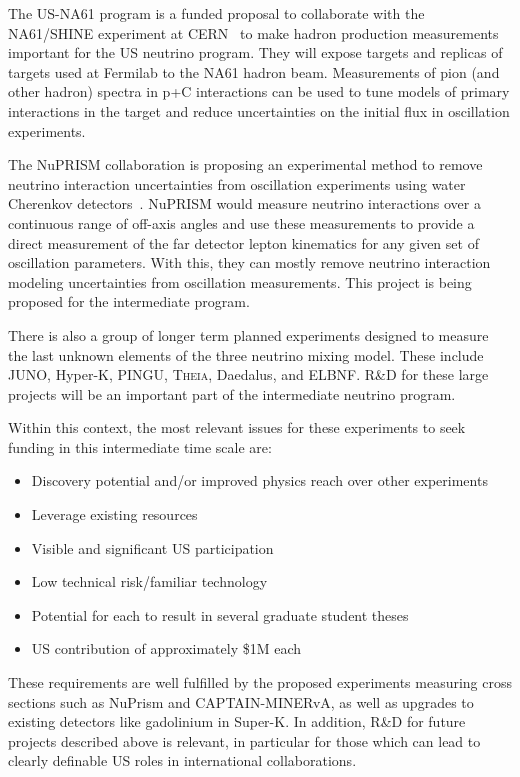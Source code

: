 The US-NA61 program is a funded proposal to collaborate with the
NA61/SHINE experiment at CERN~\cite{Gazdzicki:2014bxa} to make hadron
production measurements important for the US neutrino program.  They
will expose targets and replicas of targets used at Fermilab to the
NA61 hadron beam.  Measurements of pion (and other hadron) spectra in
p+C interactions can be used to tune models of primary interactions in
the target and reduce uncertainties on the initial flux in oscillation
experiments.

The NuPRISM collaboration is proposing an experimental method to
remove neutrino interaction uncertainties from oscillation
experiments using water Cherenkov detectors~\cite{Bhadra:2014oma}.  NuPRISM would measure neutrino
interactions over a continuous range of off-axis angles and use these
measurements to provide a direct measurement of the far detector
lepton kinematics for any given set of oscillation parameters.  With
this, they can mostly remove neutrino interaction modeling
uncertainties from oscillation measurements.  This project is being
proposed for the intermediate program.

There is also a group of longer term planned experiments designed to
measure the last unknown elements of the three neutrino mixing model.
These include JUNO, Hyper-K, PINGU, \textsc{Theia}, Daedalus, and ELBNF. R\&D
for these large projects will be an important part of the intermediate
neutrino program.

Within this context, the most relevant issues for these experiments
to seek funding in this intermediate time scale are:
\vspace*{-0.4cm}
\begin{itemize}
\item Discovery potential and/or improved physics reach over other experiments
\vspace*{-0.4cm}
\item Leverage existing resources \vspace*{-0.4cm}
\item Visible and significant US participation \vspace*{-0.4cm}
\item Low technical risk/familiar technology \vspace*{-0.4cm}
\item Potential for each to result in several graduate student theses \vspace*{-0.4cm}
\item US contribution of approximately \$1M each \vspace*{-0.4cm}
\end{itemize}

These requirements are well fulfilled by the proposed experiments
measuring cross sections such as NuPrism and CAPTAIN-MINERvA, as well
as upgrades to existing detectors like gadolinium in Super-K.  In
addition, R\&D for future projects described above is
relevant, in particular for those which can lead to clearly definable US
roles in international collaborations.
